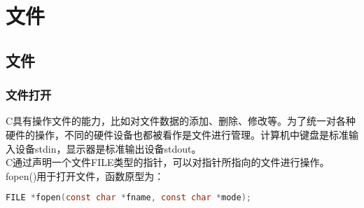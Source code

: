 \chapter{文件}

\section{文件}

\subsection{文件打开}

C具有操作文件的能力，比如对文件数据的添加、删除、修改等。为了统一对各种硬件的操作，不同的硬件设备也都被看作是文件进行管理。计算机中键盘是标准输入设备stdin，显示器是标准输出设备stdout。\\

C通过声明一个文件FILE类型的指针，可以对指针所指向的文件进行操作。\\

fopen()用于打开文件，函数原型为：

\vspace{-0.5cm}

\begin{lstlisting}[language=C]
FILE *fopen(const char *fname, const char *mode);
\end{lstlisting}

